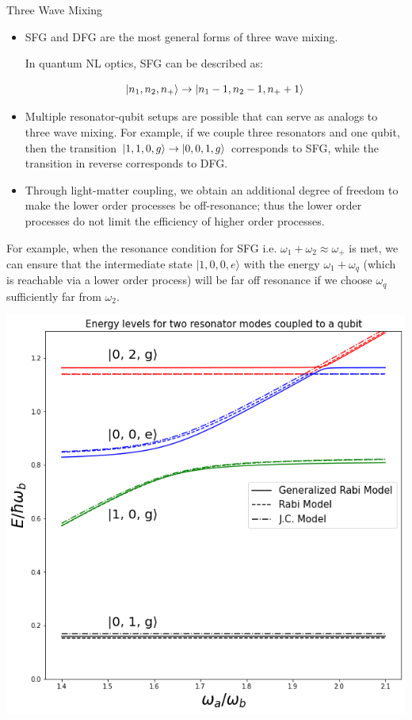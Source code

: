 \documentclass[pdf,9pt]{beamer}
\begin{document}
    
    \begin{frame}{Three Wave Mixing}
    \begin{itemize}
        \item SFG and DFG are the most general forms of three wave mixing.
        
                In quantum NL optics, SFG can be described as: 
        
        $$\ket{n_1, n_2, n_+} \rightarrow \ket{n_1 - 1, n_2 - 1, n_+ + 1}$$
    
    \item Multiple resonator-qubit setups are possible that can serve as analogs to three wave mixing. For example, if we couple three resonators and one qubit, then the transition  $\ket{1,1,0,g} \rightarrow \ket{0,0,1,g}$  corresponds to SFG, while the transition in reverse corresponds to DFG.
    
    \item Through light-matter coupling, we obtain an additional degree of freedom to make the lower order processes be off-resonance; thus the lower order processes do not limit the efficiency of higher order processes.

    \end{itemize}
    
    For example, when the resonance condition for SFG i.e. $\omega_1 + \omega_2 \approx \omega_+$ is met, we can ensure that the intermediate state $|{1,0,0,e}\rangle$ with the energy $\omega_1 + \omega_q$ (which is reachable via a lower order process) will be far off resonance if we choose $\omega_q$ sufficiently far from $\omega_2$.

    \end{frame}
    
    \begin{frame}{}
         \begin{center}
            \includegraphics[scale=0.4]{fig3_paper_plot.png}
        \end{center}
    \end{frame}
\end{document}
